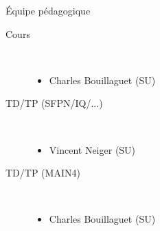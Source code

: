 \documentclass[10pt]{beamer}
\begin{document}
\begin{frame}
  \begin{alertblock}{Équipe pédagogique}
    \begin{description}
    \item[Cours] ~ 
      \begin{itemize}    
      \item Charles Bouillaguet (SU)
      \end{itemize}
      
    \item[TD/TP (SFPN/IQ/...)] ~ 
      \begin{itemize}    
      \item Vincent Neiger (SU)
      \end{itemize}

    \item[TD/TP (MAIN4)] ~ 
      \begin{itemize}
      \item Charles Bouillaguet (SU)
      \end{itemize}
    \end{description}
  \end{alertblock}
\end{frame}



\end{document}
